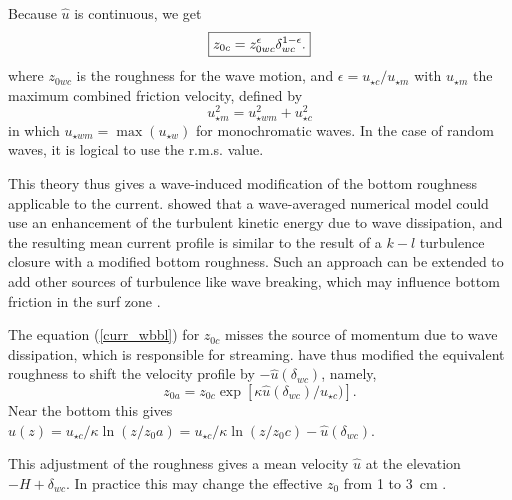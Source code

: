 Because $\widehat{u}$ is continuous, we get 
\begin{equation}
\fbox{$\displaystyle z_{0c} = z_{0wc}^\epsilon \delta_{wc}^{1-\epsilon}.$}\label{z0c}
\end{equation}
where $z_{0wc}$ is the roughness for the wave motion, and $\epsilon=u_{\star c}/u_{\star
m}$ with $u_{\star m}$ the maximum combined friction velocity, defined by 
\begin{equation}
u_{\star m}^2 = u_{\star w m}^2 + u_{\star c}^2
\end{equation}
in which  $u_{\star w m}=\max(u_{\star w})$ for monochromatic waves. In the case of random waves, it is logical to use the  r.m.s. value. 

This theory thus gives a wave-induced modification of the bottom roughness applicable to the current. \cite{Mellor2002} showed that a wave-averaged numerical model could use an enhancement of the turbulent kinetic energy due to wave dissipation, and the resulting mean current profile is similar to the result of a $k-l$ turbulence closure with a modified bottom roughness. Such an approach can be extended to add other sources of turbulence like wave breaking, which may influence bottom friction in the surf zone 
 \citep{Feddersen&al.2003} .


The equation (\ref{curr_wbbl}) for  $z_{0c}$ misses the source of momentum due to wave dissipation, which is responsible for streaming. 
\cite{Mathisen&Madsen1996b} have thus modified the equivalent roughness to shift the velocity profile by  $-\widehat{u}(\delta_{wc})$, namely, 
\begin{equation}
z_{0a}=z_{0c} \exp \left[\kappa \widehat{u}(\delta_{wc})/u_{\star c})\right].
\end{equation}
Near the bottom this gives  $\widehat{u}(z)=u_{\star c}/\kappa \ln(z/z_0a) = u_{\star c}/\kappa  \ln(z/z_0c) -\widehat{u}(\delta_{wc})$.

This adjustment of the roughness gives a mean velocity  $\widehat{u}$ at the elevation $-H+\delta_{wc}$. 
In practice this may change the effective $z_0$ from  1 to 3~cm \citep{Mathisen&Madsen1996b}.


